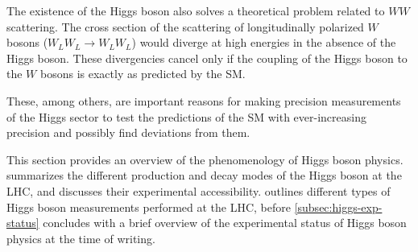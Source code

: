 The existence of the Higgs boson also solves a theoretical problem related to $WW$ scattering.
The cross section of the scattering of longitudinally polarized $W$ bosons ($W_LW_L \to W_LW_L$) would diverge at high energies in the absence of the Higgs boson. These divergencies cancel only if the coupling of the Higgs boson to the $W$ bosons is exactly as predicted by the SM.

These, among others, are important reasons for making precision measurements of the Higgs sector to test the predictions of the SM with ever-increasing precision and possibly find deviations from them. 

This section provides an overview of the phenomenology of Higgs boson physics.  summarizes the different production and decay modes of the Higgs boson at the LHC, and discusses their experimental accessibility.  outlines different types of Higgs boson measurements performed at the LHC, before \cref{subsec:higgs-exp-status} concludes with a brief overview of the experimental status of Higgs boson physics at the time of writing.






